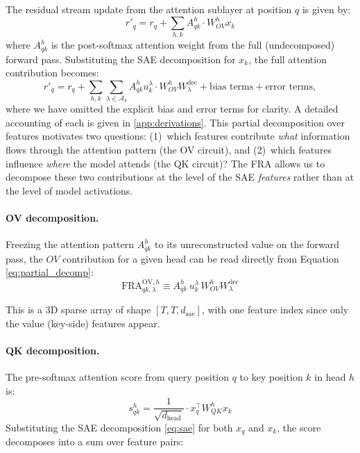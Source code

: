 \documentclass{article}
\theoremstyle{plain}
\theoremstyle{definition}
\theoremstyle{remark}
\newcommand{\WOV}{W_{OV}}
\newcommand{\WQK}{W_{QK}}
\newcommand{\dhead}{d_{\mathrm{head}}}
\newcommand{\dsae}{d_{\mathrm{sae}}}
\begin{document}

The residual stream update from the attention sublayer at position $q$ is given by:
\begin{equation}
    r'_q = r_q + \sum_{h,k} A^h_{qk} \cdot \WOV^h x_k
    \label{eq:full_layer}
\end{equation}
where $A^h_{qk}$ is the post-softmax attention weight from the full (undecomposed) forward pass. Substituting the SAE decomposition for $x_k$, the full attention contribution becomes:
\begin{equation}
    r'_q = r_q + \sum_{h,k} \sum_{\lambda \in \mathcal{A}_k} A^h_{qk} u_k^\lambda \cdot \WOV^h W^{\mathrm{dec}}_\lambda + \text{bias terms}+\text{error terms},
    \label{eq:partial_decomp}
\end{equation}
where we have omitted the explicit bias and error terms for clarity. A detailed accounting of each is given in \cref{app:derivations}.
This partial decomposition over features motivates two questions: (1)~which features contribute \emph{what} information flows through the attention pattern (the OV circuit), and (2)~which features influence \emph{where} the model attends (the QK circuit)? The FRA allows us to decompose these two contributions at the level of the SAE \textit{features} rather than at the level of model activations.

\paragraph{OV decomposition.} Freezing the attention pattern $A^h_{qk}$ to its unreconstructed value on the forward pass, the $OV$ contribution for a given head can be read directly from Equation \eqref{eq:partial_decomp}:
\begin{equation}
\label{eq:ov_fra}
\mathrm{FRA}^{\mathrm{OV},h}_{qk,\lambda} \equiv A^h_{qk}\, u^\lambda_k\, \WOV^h W^{\mathrm{dec}}_\lambda
\end{equation}

This is a 3D sparse array of shape $[T, T, \dsae]$, with one feature index since only the value (key-side) features appear.

\paragraph{QK decomposition.} The pre-softmax attention score from query position $q$ to key position $k$ in head $h$ is:
\begin{equation}
    s^h_{qk} = \frac{1}{\sqrt{\dhead}} \cdot x_q^\top \WQK^h x_k
    \label{eq:attn_score}
\end{equation}
Substituting the SAE decomposition \eqref{eq:sae} for both $x_q$ and $x_k$, the score decomposes into a sum over feature pairs:
\end{document}
